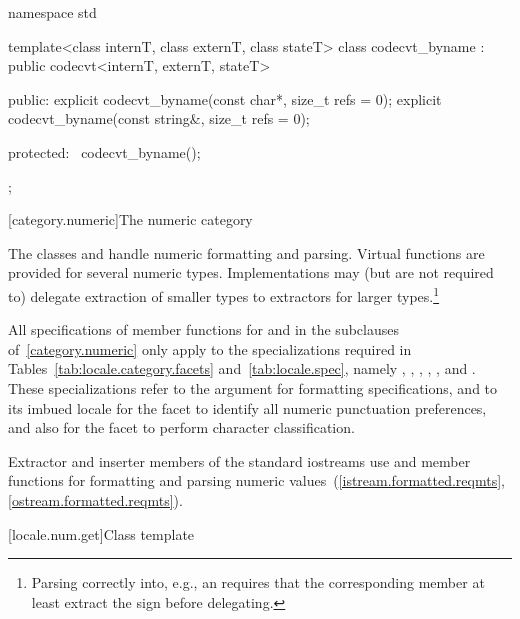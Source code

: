 %
\begin{codeblock}
namespace std {
  template<class internT, class externT, class stateT>
    class codecvt_byname : public codecvt<internT, externT, stateT> {
    public:
      explicit codecvt_byname(const char*, size_t refs = 0);
      explicit codecvt_byname(const string&, size_t refs = 0);

    protected:
      ~codecvt_byname();
    };
}
\end{codeblock}

[category.numeric]{The numeric category}

\pnum
The classes
and
handle numeric formatting and parsing.
Virtual functions are provided for several numeric types.
Implementations may (but are not required to) delegate extraction
of smaller types to extractors for larger types.\footnote{Parsing
 correctly into, e.g., an
requires that the corresponding member
at least extract the sign before delegating.}

\pnum
All specifications of member functions for
and
in the subclauses of~\ref{category.numeric} only apply to the
specializations required in Tables~\ref{tab:locale.category.facets}
and~\ref{tab:locale.spec}, namely
,
,
,
,
,
and
.
These specializations refer to the
argument for formatting specifications,
and to its imbued locale for the
facet to identify all numeric punctuation preferences,
and also for the
facet to perform character classification.

\pnum
Extractor and inserter members of the standard iostreams use
and
member functions for formatting and parsing numeric values~(\ref{istream.formatted.reqmts}, \ref{ostream.formatted.reqmts}).

[locale.num.get]{Class template }

